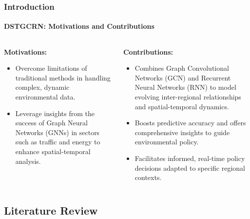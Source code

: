 \documentclass[light]{lutbeamer} %
\begin{document}
\begin{frame}
    \frametitle{Introduction}
    \framesubtitle{DSTGCRN: Motivations and Contributions}
    \begin{columns}[T] %
        \begin{column}{0.45\textwidth}
            \textbf{Motivations:}
            \begin{itemize}
                \item Overcome limitations of traditional methods in handling complex, dynamic environmental data.
                \item Leverage insights from the success of Graph Neural Networks (GNNs) in sectors such as traffic and energy to enhance spatial-temporal analysis.
            \end{itemize}
        \end{column}
        \begin{column}{0.45\textwidth}
            \textbf{Contributions:}
            \begin{itemize}
                \item Combines Graph Convolutional Networks (GCN) and Recurrent Neural Networks (RNN) to model evolving inter-regional relationships and spatial-temporal dynamics.
                \item Boosts predictive accuracy and offers comprehensive insights to guide environmental policy.
                \item Facilitates informed, real-time policy decisions adapted to specific regional contexts.
            \end{itemize}
        \end{column}
    \end{columns}
\end{frame}

\subsection{Literature Review}
\end{document}
